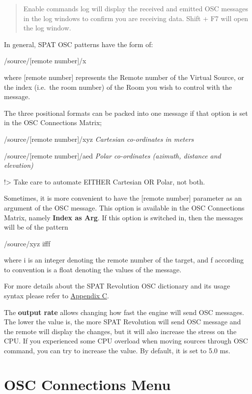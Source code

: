 \documentclass[
  letterpaper,
  DIV=11,
  numbers=noendperiod]{scrreport}
\begin{document}
\begin{quote}
Enable commands log will display the received and emitted OSC messages
in the log windows to confirm you are receiving data. Shift + F7 will
open the log window.
\end{quote}

In general, SPAT OSC patterns have the form of:

/source/{[}remote number{]}/x

where {[}remote number{]} represents the Remote number of the Virtual
Source, or the index (i.e.~the room number) of the Room you wish to
control with the message.

The three positional formats can be packed into one message if that
option is set in the OSC Connections Matrix;

/source/{[}remote number{]}/xyz \emph{Cartesian co-ordinates in meters}

/source/{[}remote number{]}/aed \emph{Polar co-ordinates (azimuth,
distance and elevation)}

!\textgreater{} Take care to automate EITHER Cartesian OR Polar, not
both.

Sometimes, it is more convenient to have the {[}remote number{]}
parameter as an argument of the OSC message. This option is available in
the OSC Connections Matrix, namely \textbf{Index as Arg}. If this option
is switched in, then the messages will be of the pattern

/source/xyz ifff

where i is an integer denoting the remote number of the target, and f
according to convention is a float denoting the values of the message.

For more details about the SPAT Revolution OSC dictionary and its usage
syntax please refer to \href{Appendix_C_OSC_Table.md}{Appendix C}.

The \textbf{output rate} allows changing how fast the engine will send
OSC messages. The lower the value is, the more SPAT Revolution will send
OSC message and the remote will display the changes, but it will also
increase the stress on the CPU. If you experienced some CPU overload
when moving sources through OSC command, you can try to increase the
value. By default, it is set to 5.0 ms.

\hypertarget{osc-connections-menu}{%
\section{OSC Connections Menu}\label{osc-connections-menu}}
\end{document}
